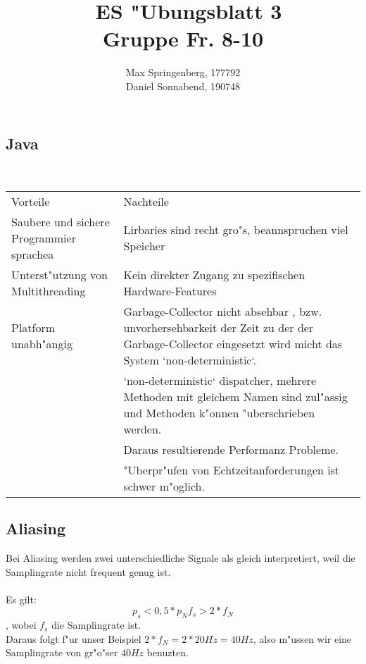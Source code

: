 \documentclass{article}
\author{Max Springenberg, 177792\\
        Daniel Sonnabend, 190748}
\title{\
    ES "Ubungsblatt 3\\
    Gruppe Fr. 8-10
    }
\date{}
\begin{document}
\maketitle
\newpage

\subsection{Java}\ \\
\begin{table}
\centering
\begin{tabularx}{\linewidth}{LL}
	\hline
	
	Vorteile 						        & Nachteile\\
    Saubere und sichere Programmier sprachea& Lirbaries sind recht gro"s, 
                                              beannspruchen viel Speicher\\
    Unterst"utzung von Multithreading       & Kein direkter Zugang zu 
                                              spezifischen Hardware-Features\\
    Platform unabh"angig                    & Garbage-Collector nicht absehbar
                                              , bzw. unvorhersehbarkeit der Zeit
                                              zu der der Garbage-Collector
                                              eingesetzt wird micht das System
                                              `non-deterministic`.\\
                                            & `non-deterministic` dispatcher,
                                               mehrere Methoden mit gleichem
                                               Namen sind zul"assig und Methoden
                                               k"onnen "uberschrieben werden.\\
                                            & Daraus resultierende Performanz
                                              Probleme.\\
                                            & "Uberpr"ufen von 
                                              Echtzeitanforderungen ist schwer
                                              m"oglich.\\
\end{tabularx}
\end{table}

\subsection{Aliasing}
Bei Aliasing werden zwei unterschiedliche Signale als gleich interpretiert, 
    weil die Samplingrate nicht frequent genug ist.\\
\\
Es gilt:\\$$
    p_s < 0,5 * p_N
    f_s > 2* f_N$$
, wobei $f_s$ die Samplingrate ist.\\
Daraus folgt f"ur unser Beispiel $2*f_N = 2 * 20Hz = 40Hz$, also m"ussen wir
    eine Samplingrate von gr"o"ser $40Hz$  benuzten.\\
\end{document}
